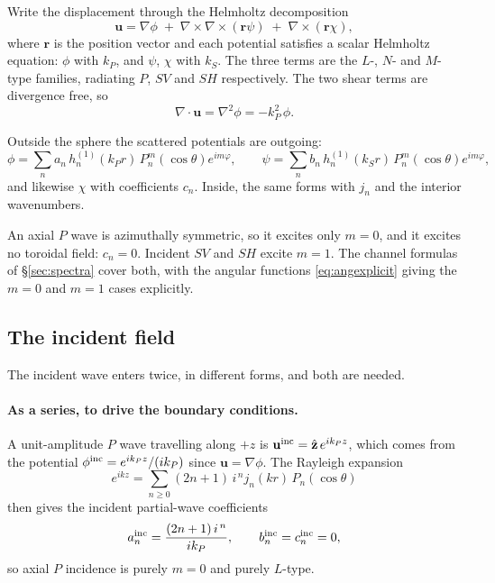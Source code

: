 \documentclass[11pt,a4paper]{article}
\newcommand{\bu}{\mathbf{u}}
\newcommand{\br}{\mathbf{r}}
\newcommand{\zhat}{\hat{\mathbf{z}}}
\begin{document}
Write the displacement through the Helmholtz decomposition
\begin{equation}\label{eq:helm}
  \bu = \nabla\phi \;+\; \nabla\times\nabla\times(\br\psi) \;+\; \nabla\times(\br\chi),
\end{equation}
where $\br$ is the position vector and each potential satisfies a scalar
Helmholtz equation: $\phi$ with $k_P$, and $\psi$, $\chi$ with $k_S$.  The three
terms are the $L$-, $N$- and $M$-type families, radiating $P$, $SV$ and $SH$
respectively.  The two shear terms are divergence free, so
\begin{equation}\label{eq:div}
  \nabla\cdot\bu = \nabla^2\phi = -k_P^2\,\phi .
\end{equation}

Outside the sphere the scattered potentials are outgoing:
\begin{equation}\label{eq:pots}
  \phi = \sum_n a_n\,h_n^{(1)}(k_P r)\,P_n^m(\cos\theta)e^{im\varphi},
  \qquad
  \psi = \sum_n b_n\,h_n^{(1)}(k_S r)\,P_n^m(\cos\theta)e^{im\varphi},
\end{equation}
and likewise $\chi$ with coefficients $c_n$.  Inside, the same forms with
$j_n$ and the interior wavenumbers.

An axial $P$ wave is azimuthally symmetric, so it excites only $m = 0$, and it
excites no toroidal field: $c_n = 0$.  Incident $SV$ and $SH$ excite $m = 1$.
The channel formulas of \S\ref{sec:spectra} cover both, with the angular
functions \eqref{eq:angexplicit} giving the $m=0$ and $m=1$ cases explicitly.

\subsection{The incident field}\label{sec:incident}

The incident wave enters twice, in different forms, and both are needed.

\paragraph{As a series, to drive the boundary conditions.}  A unit-amplitude
$P$ wave travelling along $+z$ is $\bu^{\rm inc} = \zhat\,e^{ik_Pz}$, which
comes from the potential $\phi^{\rm inc} = e^{ik_Pz}/(ik_P)$ since
$\bu = \nabla\phi$.  The Rayleigh expansion
\begin{equation}\label{eq:rayleigh}
  e^{ikz} = \sum_{n\ge0}(2n+1)\,i^{\,n} j_n(kr)\,P_n(\cos\theta)
\end{equation}
then gives the incident partial-wave coefficients
\begin{equation}\label{eq:aninc}
  a^{\rm inc}_n = \frac{(2n+1)\,i^{\,n}}{i k_P},
  \qquad b^{\rm inc}_n = c^{\rm inc}_n = 0 ,
\end{equation}
so axial $P$ incidence is purely $m=0$ and purely $L$-type.
\end{document}
